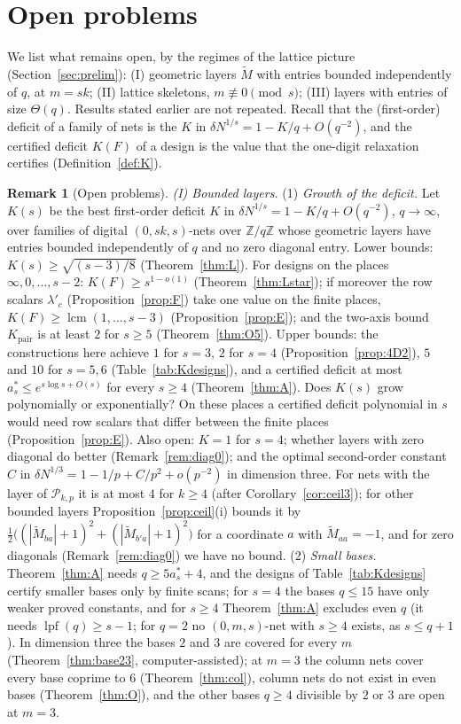 \documentclass[11pt]{amsart}
\theoremstyle{definition}
\newtheorem{remark}[theorem]{Remark}
\theoremstyle{plain}
\newcommand{\Z}{\mathbb{Z}}
\begin{document}
\section{Open problems}\label{sec:remarks}
\fussy
We list what remains open, by the regimes of the lattice picture (Section~\ref{sec:prelim}): (I) geometric layers $\tilde M$ with entries bounded independently of $q$, at $m=sk$; (II) lattice skeletons, $m\not\equiv0\pmod s$; (III) layers with entries of size $\Theta(q)$. Results stated earlier are not repeated. Recall that the (first-order) deficit of a family of nets is the $K$ in $\delta N^{1/s}=1-K/q+O(q^{-2})$, and the certified deficit $K(F)$ of a design is the value that the one-digit relaxation certifies (Definition~\ref{def:K}).

\begin{remark}[Open problems]\label{rem:open}
\emph{(I) Bounded layers.} (1) \emph{Growth of the deficit.} Let $K(s)$ be the best first-order deficit $K$ in $\delta N^{1/s}=1-K/q+O(q^{-2})$, $q\to\infty$, over families of digital $(0,sk,s)$-nets over $\Z/q\Z$ whose geometric layers have entries bounded independently of $q$ and no zero diagonal entry. Lower bounds: $K(s)\ge\sqrt{(s-3)/8}$ (Theorem~\ref{thm:L}). For designs on the places $\infty,0,\dots,s-2$: $K(F)\ge s^{1-o(1)}$ (Theorem~\ref{thm:Lstar}); if moreover the row scalars $\lambda'_c$ (Proposition~\ref{prop:F}) take one value on the finite places, $K(F)\ge\operatorname{lcm}(1,\dots,s-3)$ (Proposition~\ref{prop:E}); and the two-axis bound $K_{\mathrm{pair}}$ is at least $2$ for $s\ge5$ (Theorem~\ref{thm:O5}). Upper bounds: the constructions here achieve $1$ for $s=3$, $2$ for $s=4$ (Proposition~\ref{prop:4D2}), $5$ and $10$ for $s=5,6$ (Table~\ref{tab:Kdesigns}), and a certified deficit at most $a^*_s\le e^{s\log s+O(s)}$ for every $s\ge4$ (Theorem~\ref{thm:A}). Does $K(s)$ grow polynomially or exponentially? On these places a certified deficit polynomial in $s$ would need row scalars that differ between the finite places (Proposition~\ref{prop:E}). Also open: $K=1$ for $s=4$; whether layers with zero diagonal do better (Remark~\ref{rem:diag0}); and the optimal second-order constant $C$ in $\delta N^{1/3}=1-1/p+C/p^2+o(p^{-2})$ in dimension three. For nets with the layer of $\mathcal P_{k,p}$ it is at most $4$ for $k\ge4$ (after Corollary~\ref{cor:ceil3}); for other bounded layers Proposition~\ref{prop:ceil}(i) bounds it by $\frac12\bigl((|\tilde M_{ba}|+1)^2+(|\tilde M_{b'a}|+1)^2\bigr)$ for a coordinate $a$ with $\tilde M_{aa}=-1$, and for zero diagonals (Remark~\ref{rem:diag0}) we have no bound. (2) \emph{Small bases.} Theorem~\ref{thm:A} needs $q\ge5a^*_s+4$, and the designs of Table~\ref{tab:Kdesigns} certify smaller bases only by finite scans; for $s=4$ the bases $q\le15$ have only weaker proved constants, and for $s\ge4$ Theorem~\ref{thm:A} excludes even $q$ (it needs $\operatorname{lpf}(q)\ge s-1$; for $q=2$ no $(0,m,s)$-net with $s\ge4$ exists, as $s\le q+1$). In dimension three the bases $2$ and $3$ are covered for every $m$ (Theorem~\ref{thm:base23}, computer-assisted); at $m=3$ the column nets cover every base coprime to $6$ (Theorem~\ref{thm:col}), column nets do not exist in even bases (Theorem~\ref{thm:O}), and the other bases $q\ge4$ divisible by $2$ or $3$ are open at $m=3$.


\end{remark}
\end{document}
